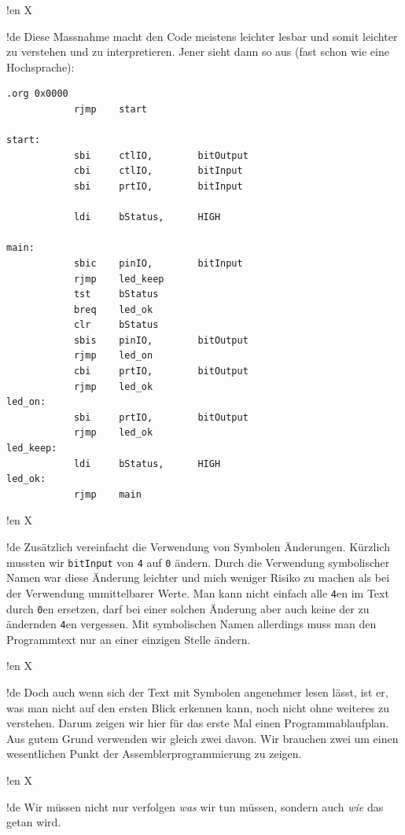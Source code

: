!en X

!de Diese Massnahme macht den Code meistens leichter lesbar und somit leichter zu verstehen und zu interpretieren. Jener sieht dann so aus (fast schon wie eine Hochsprache):

\begin{lstlisting}
.org 0x0000
            rjmp    start

start:
            sbi     ctlIO,        bitOutput
            cbi     ctlIO,        bitInput
            sbi     prtIO,        bitInput

            ldi     bStatus,      HIGH

main:
            sbic    pinIO,        bitInput
            rjmp    led_keep
            tst     bStatus
            breq    led_ok
            clr     bStatus
            sbis    pinIO,        bitOutput
            rjmp    led_on
            cbi     prtIO,        bitOutput
            rjmp    led_ok
led_on:
            sbi     prtIO,        bitOutput
            rjmp    led_ok
led_keep:
            ldi     bStatus,      HIGH
led_ok:
            rjmp    main
\end{lstlisting}


!en X

!de Zusätzlich vereinfacht die Verwendung von Symbolen Änderungen. Kürzlich mussten wir \texttt{bitInput} von \texttt{4} auf \texttt{0} ändern. Durch die Verwendung symbolischer Namen war diese Änderung leichter und mich weniger Risiko zu machen als bei der Verwendung unmittelbarer Werte. Man kann nicht einfach alle \texttt{4}en im Text durch \texttt{0}en ersetzen, darf bei einer solchen Änderung aber auch keine der zu ändernden \texttt{4}en vergessen. Mit symbolischen Namen allerdings muss man den Programmtext nur an einer einzigen Stelle ändern.



!en X

!de Doch auch wenn sich der Text mit Symbolen angenehmer lesen lässt, ist er, was man nicht auf den ersten Blick erkennen kann, noch nicht ohne weiteres zu verstehen. Darum zeigen wir hier für das erste Mal einen Programmablaufplan. Aus gutem Grund verwenden wir gleich zwei davon. Wir brauchen zwei um einen wesentlichen Punkt der Assemblerprogrammierung zu zeigen.



!en X

!de Wir müssen nicht nur verfolgen \textit{was} wir tun müssen, sondern auch \textit{wie} das getan wird.




